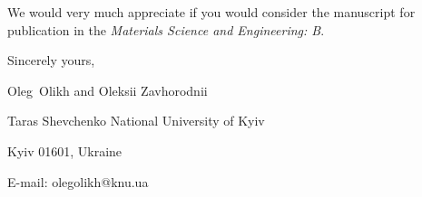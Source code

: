\documentclass[preprint]{elsarticle}
\begin{document}
We would  very much appreciate if you would consider the manuscript for publication in the \emph{Materials Science and Engineering: B}.

%


\vspace{3mm}

Sincerely yours,

Oleg~Olikh and Oleksii Zavhorodnii


Taras Shevchenko National University of Kyiv


Kyiv 01601, Ukraine

E-mail: olegolikh@knu.ua
\end{document}
